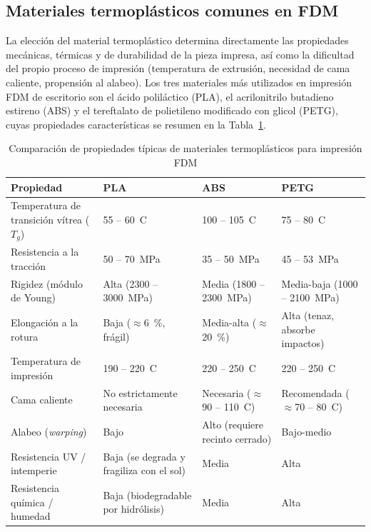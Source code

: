 \subsection{Materiales termoplásticos comunes en FDM}

La elección del material termoplástico determina directamente las propiedades mecánicas, térmicas y de durabilidad de la pieza impresa, así como la dificultad del propio proceso de impresión (temperatura de extrusión, necesidad de cama caliente, propensión al alabeo). Los tres materiales más utilizados en impresión FDM de escritorio son el ácido poliláctico (PLA), el acrilonitrilo butadieno estireno (ABS) y el tereftalato de polietileno modificado con glicol (PETG), cuyas propiedades características se resumen en la Tabla~\ref{tab:comparativa_materiales_3d}.

\begin{table}[H]
	\centering
	\captionsetup{labelformat=simple, labelsep=newline, textfont=it, labelfont=bf, justification=raggedright, singlelinecheck=false}
	\caption{Comparación de propiedades típicas de materiales termoplásticos para impresión FDM}
	\label{tab:comparativa_materiales_3d}
	\begin{tabularx}{\textwidth}{>{\raggedright\arraybackslash}p{2.6cm} X X X}
		\toprule
		\rowcolor[rgb]{0.851, 0.851, 0.851}
		\textbf{Propiedad} & \textbf{PLA} & \textbf{ABS} & \textbf{PETG} \\
		\midrule
		Temperatura de transición vítrea ($T_g$) & 55 -- 60~\textdegree C & 100 -- 105~\textdegree C & 75 -- 80~\textdegree C \\
		\addlinespace
		Resistencia a la tracción & 50 -- 70~MPa & 35 -- 50~MPa & 45 -- 53~MPa \\
		\addlinespace
		Rigidez (módulo de Young) & Alta (2300 -- 3000~MPa) & Media (1800 -- 2300~MPa) & Media-baja (1000 -- 2100~MPa) \\
		\addlinespace
		Elongación a la rotura & Baja ($\approx$6~\%, frágil) & Media-alta ($\approx$20~\%) & Alta (tenaz, absorbe impactos) \\
		\addlinespace
		Temperatura de impresión & 190 -- 220~\textdegree C & 220 -- 250~\textdegree C & 220 -- 250~\textdegree C \\
		\addlinespace
		Cama caliente & No estrictamente necesaria & Necesaria ($\approx$90 -- 110~\textdegree C) & Recomendada ($\approx$70 -- 80~\textdegree C) \\
		\addlinespace
		Alabeo (\textit{warping}) & Bajo & Alto (requiere recinto cerrado) & Bajo-medio \\
		\addlinespace
		Resistencia UV / intemperie & Baja (se degrada y fragiliza con el sol) & Media & Alta \\
		\addlinespace
		Resistencia química / humedad & Baja (biodegradable por hidrólisis) & Media & Alta \\
		\bottomrule
	\end{tabularx}
	\vspace{0.2cm}


\end{table}
